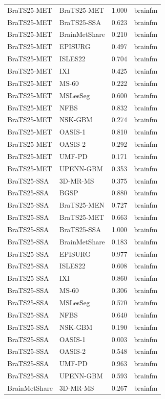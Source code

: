 \begin{tabular}{llrl}
BraTS25-MET & BraTS25-MET & 1.000 & brainfm \\
BraTS25-MET & BraTS25-SSA & 0.623 & brainfm \\
BraTS25-MET & BrainMetShare & 0.210 & brainfm \\
BraTS25-MET & EPISURG & 0.497 & brainfm \\
BraTS25-MET & ISLES22 & 0.704 & brainfm \\
BraTS25-MET & IXI & 0.425 & brainfm \\
BraTS25-MET & MS-60 & 0.222 & brainfm \\
BraTS25-MET & MSLesSeg & 0.600 & brainfm \\
BraTS25-MET & NFBS & 0.832 & brainfm \\
BraTS25-MET & NSK-GBM & 0.274 & brainfm \\
BraTS25-MET & OASIS-1 & 0.810 & brainfm \\
BraTS25-MET & OASIS-2 & 0.292 & brainfm \\
BraTS25-MET & UMF-PD & 0.171 & brainfm \\
BraTS25-MET & UPENN-GBM & 0.353 & brainfm \\
BraTS25-SSA & 3D-MR-MS & 0.375 & brainfm \\
BraTS25-SSA & BGSP & 0.880 & brainfm \\
BraTS25-SSA & BraTS25-MEN & 0.727 & brainfm \\
BraTS25-SSA & BraTS25-MET & 0.663 & brainfm \\
BraTS25-SSA & BraTS25-SSA & 1.000 & brainfm \\
BraTS25-SSA & BrainMetShare & 0.183 & brainfm \\
BraTS25-SSA & EPISURG & 0.977 & brainfm \\
BraTS25-SSA & ISLES22 & 0.608 & brainfm \\
BraTS25-SSA & IXI & 0.860 & brainfm \\
BraTS25-SSA & MS-60 & 0.306 & brainfm \\
BraTS25-SSA & MSLesSeg & 0.570 & brainfm \\
BraTS25-SSA & NFBS & 0.640 & brainfm \\
BraTS25-SSA & NSK-GBM & 0.190 & brainfm \\
BraTS25-SSA & OASIS-1 & 0.003 & brainfm \\
BraTS25-SSA & OASIS-2 & 0.548 & brainfm \\
BraTS25-SSA & UMF-PD & 0.963 & brainfm \\
BraTS25-SSA & UPENN-GBM & 0.593 & brainfm \\
BrainMetShare & 3D-MR-MS & 0.267 & brainfm \\

\end{tabular}
